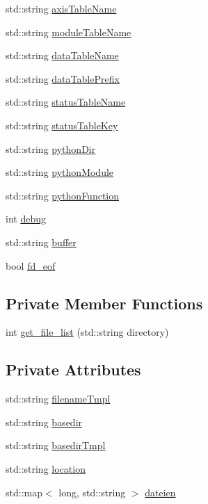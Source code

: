 \begin{DoxyCompactItemize}
std\-::string \hyperlink{classDAQDevice_af33c38b4bf6c138dc60d84a9bfb6df85}{axis\-Table\-Name}
\item 
std\-::string \hyperlink{classDAQDevice_a0061ca1e9e172bc2cb113a6f6b7f0ade}{module\-Table\-Name}
\item 
std\-::string \hyperlink{classDAQDevice_a3b932e09b546454324cc07d7958f58ac}{data\-Table\-Name}
\item 
std\-::string \hyperlink{classDAQDevice_ac2ae1cde05bf5d13d18e213c94c5dadc}{data\-Table\-Prefix}
\item 
std\-::string \hyperlink{classDAQDevice_a9e039294e443228fc1854ec798d1b5c4}{status\-Table\-Name}
\item 
std\-::string \hyperlink{classDAQDevice_a1d817232e36e532fbed88e7013e30567}{status\-Table\-Key}
\item 
std\-::string \hyperlink{classDAQDevice_a4d916c2296ae785dbe02859721b410e6}{python\-Dir}
\item 
std\-::string \hyperlink{classDAQDevice_a75b36464a8009089f1f5721764f7bf70}{python\-Module}
\item 
std\-::string \hyperlink{classDAQDevice_ac2662dfe78ec08ab4bd8cc8e159fed0f}{python\-Function}
\item 
int \hyperlink{classDAQDevice_ae7b23729ae0dc7ab3cd0e4c633bf4e25}{debug}
\item 
std\-::string \hyperlink{classDAQDevice_ab661aa5c5b4bafe78354f5169b1c7d2f}{buffer}
\item 
bool \hyperlink{classDAQDevice_a0adfd30435b899ce439998bbdd3dae91}{fd\-\_\-eof}
\end{DoxyCompactItemize}
\subsection*{Private Member Functions}
\begin{DoxyCompactItemize}
\item 
int \hyperlink{classDAQDevice_ac3c405fb5cc77a22c450b952ae6b82f3}{get\-\_\-file\-\_\-list} (std\-::string directory)
\end{DoxyCompactItemize}
\subsection*{Private Attributes}
\begin{DoxyCompactItemize}
\item 
std\-::string \hyperlink{classDAQDevice_a2abc939adabdc9bc9a88bd1db5dcfd08}{filename\-Tmpl}
\item 
std\-::string \hyperlink{classDAQDevice_add8342b70f7350c0d8b7bf4ba3e9c5b4}{basedir}
\item 
std\-::string \hyperlink{classDAQDevice_a6dc47f2c1a792f5a1ed09b03ac98e8cc}{basedir\-Tmpl}
\item 
std\-::string \hyperlink{classDAQDevice_aab09bfdbb1d0aa4b413e4bbbc5e3c5a6}{location}
\item 
std\-::map$<$ long, std\-::string $>$ \hyperlink{classDAQDevice_a962745a4a4f20898c918d59fabf05e2a}{dateien}
\end{DoxyCompactItemize}


